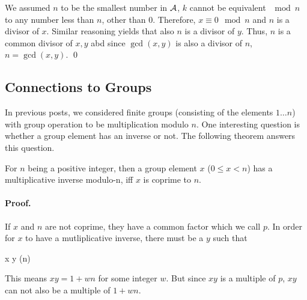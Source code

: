 We assumed $n$ to be the smallest number in $\mathcal{A}$, $k$ cannot be equivalent $\mod n$ to any number less than $n$, other than $0$. Therefore, $x \equiv 0 \mod n$ and $n$ is a divisor of $x$. Similar reasoning yields that also $n$ is a divisor of $y$. Thus, $n$ is a common divisor of $x,y$ abd since $\gcd(x,y)$ is also a divisor of $n$, $n = \gcd(x,y)$. \qed

\subsection{Connections to Groups}

In previous posts, we considered finite groups (consisting of the elements $1 \ldots n$) with group operation to be multiplication modulo $n$. One interesting question is whether a group element has an inverse or not. The following theorem answers this question.

\begin{theorem}
For $n$ being a positive integer, then a group element $x$ ($0 \leq x < n$) has a multiplicative inverse modulo-n, iff $x$ is coprime to $n$.
\end{theorem}

\paragraph{Proof.} If $x$ and $n$ are not coprime, they have a common factor which we call $p$. In order for $x$ to have a mutliplicative inverse, there must be a $y$ such that

\bee
x y  (\mod n)
\eee

This means $xy = 1 + wn$ for some integer $w$. But since $xy$ is a multiple of $p$, $xy$ can not also be a multiple of $1 + wn$.
